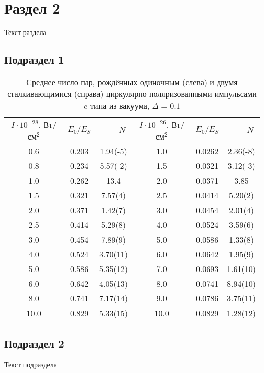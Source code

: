 
\section{Раздел 2}

Текст раздела


\subsection{Подраздел 1}


\begin{table}[t]
\caption{\label{table1}Среднее число пар, рождённых одиночным
(слева) и двумя сталкивающимися (справа) циркулярно-поляризованными
импульсами $e$-типа из вакуума, $\Delta=0.1$}
\begin{center}
\begin{tabular}{|c|c|c|c|c|c|}
\hline \multirow{2}{2cm}{$I\cdot10^{-28}$,
Вт/см$^2$}&\multirow{2}{2cm}{\quad$E_0/E_S$}&
\multirow{2}{2.5cm}{$\qquad\,
N$}&\multirow{2}{2.5cm}{$I\cdot10^{-26}$, Вт/см$^2$}&
\multirow{2}{2.5cm}{\quad$E_0/E_S$}&\multirow{2}{2.5cm}{$\qquad\, N$}\\
&&&&&\\
\hline   0.6   &  0.203 &    1.94(-5) &1.0     &0.0262   & 2.36(-8)\\
\hline   0.8   &  0.234 &    5.57(-2) &1.5     &0.0321   & 3.12(-3)\\
\hline   1.0   &  0.262 &       13.4  &2.0     &0.0371   &    3.85\\
\hline   1.5   &  0.321 &     7.57(4) &2.5     &0.0414   &  5.20(2)\\
\hline   2.0   &  0.371 &     1.42(7) &3.0     &0.0454   &  2.01(4)\\
\hline   2.5   &  0.414 &     5.29(8) &4.0     &0.0524   &  3.59(6)\\
\hline   3.0   &  0.454 &     7.89(9) &5.0     &0.0586   &  1.33(8)\\
\hline   4.0   &  0.524 &    3.70(11) &6.0     &0.0642   &  1.95(9)\\
\hline   5.0   &  0.586 &    5.35(12) &7.0     &0.0693   & 1.61(10)\\
\hline   6.0   &  0.642 &    4.05(13) &8.0     &0.0741   & 8.94(10)\\
\hline   8.0   &  0.741 &    7.17(14) &9.0     &0.0786   & 3.75(11)\\
\hline  10.0   &  0.829 &    5.33(15) &10.0    &0.0829   & 1.28(12)\\
\hline
\end{tabular}
\end{center}
\end{table}

\subsection{Подраздел 2}

Текст подраздела